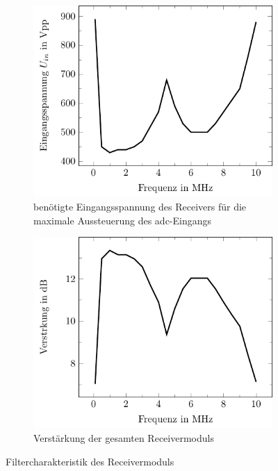 \begin{figure}[h!]
\centering
	\begin{subfigure}[t]{0.48\textwidth}
    \centering
    	\includegraphics[width=\textwidth, trim= 0mm 0mm 0mm 0mm, clip=true]{images/tests/bandpassUin}%
    	\caption{benötigte Eingangsspannung des Receivers für die maximale Aussteuerung des \ac{adc}-Eingangs}
	    \label{fig:pcb_top}
	\end{subfigure}%
    \hfil %
    \begin{subfigure}[t]{0.48\textwidth}
    	\includegraphics[width=\textwidth, trim= 0mm 0mm 0mm 0mm, clip=true]{images/tests/bandpassDB}%
    	\caption{Verstärkung der gesamten Receivermoduls}
	    \label{fig:pcb_bottom}
    \end{subfigure}
	\caption{Filtercharakteristik des Receivermoduls}
	\label{fig:bp_filter}
\end{figure}\\
